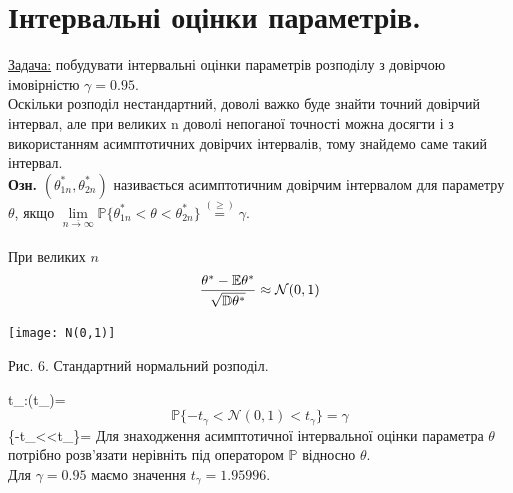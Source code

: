 \documentclass[14pt,a4paper]{scrartcl}
\begin{document}
\section{Інтервальні оцінки параметрів.}
\underline{Задача:} побудувати інтервальні оцінки параметрів розподілу з довірчою імовірністю $\gamma=0.95$.\\
Оскільки розподіл нестандартний, доволі важко буде знайти точний довірчий інтервал, але при великих n доволі непоганої точності можна досягти і з використанням асимптотичних довірчих інтервалів, тому знайдемо саме такий інтервал.\\
\textbf{Озн.} $(\theta^*_{1n},\theta^*_{2n})$ називається асимптотичним довірчим інтервалом для параметру $\theta$, якщо $\lim\limits_{\overline{n\to\infty}}{\mathbb{P}\{\theta^*_{1n}<\theta<\theta^*_{2n}\}} \stackrel{(\geq)}{=}\gamma$.\\
\\При великих $n$
$$\frac{\theta^*-\mathbb{E}\theta^*}{\sqrt{\mathbb{D}\theta^*}}\approx\mathcal{N}(0,1)$$
\begin{center}
  \texttt{[image: N(0,1)]}
  \caption{Рис. 6. Стандартний нормальний розподіл.}
\end{center}
\be t_\gamma:\Phi(t_\gamma)=\frac{}\ee
$$\mathbb{P}\{-t_\gamma<\mathcal{N}(0,1)<t_\gamma\}=\gamma$$
\be{}\{-t_\gamma<\frac{\theta^*-\E\theta^*}{\sqrt{\D\theta^*}}<t_\gamma\}=\gamma\ee
Для знаходження асимптотичної інтервальної оцінки параметра $\theta$ потрібно розв'язати нерівніть під оператором $\mathbb{P}$ відносно $\theta$.\\
Для $\gamma=0.95$ маємо значення $t_\gamma=1.95996$.
\end{document}
